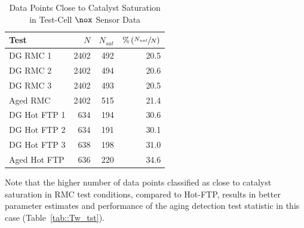 \begin{table}[ht]
    \centering
    \caption{Data Points Close to Catalyst Saturation in Test-Cell $\nox$ Sensor Data}
    \label{tab::sat_data_perc_iod}
    \begin{tabular}{l r r r}
        \hline \hline
        Test         & $N$  & $N_{sat}$ & $\% \left(  \sfrac{N_{sat}}{N}  \right)$ \\\hline \hline
        DG RMC 1     & 2402 & 492       & 20.5                           \\
        DG RMC 2     & 2402 & 494       & 20.6                           \\
        DG RMC 3     & 2402 & 493       & 20.5                           \\
        Aged RMC     & 2402 & 515       & 21.4                           \\ \hline
        DG Hot FTP 1 & 634  & 194       & 30.6                           \\
        DG Hot FTP 2 & 634  & 191       & 30.1                           \\
        DG Hot FTP 3 & 638  & 198       & 31.0                           \\
        Aged Hot FTP & 636  & 220       & 34.6                           \\
        \hline\hline
    \end{tabular}
\end{table}
Note that the higher number of data points classified as close to catalyst saturation in RMC test conditions, compared
to Hot-FTP, results in better parameter estimates and performance of the aging detection test statistic in this case
(Table~\ref{tab::Tw_tst}).
